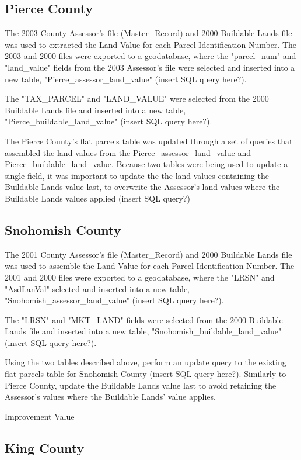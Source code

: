 \subsection{Pierce County}

The 2003 County Assessor's file (Master_Record) and 2000 Buildable
Lands file was used to extracted the Land Value for each Parcel
Identification Number. The 2003 and 2000 files were exported to a
geodatabase, where the "parcel_num" and "land_value" fields from
the 2003 Assessor's file were selected and inserted into a new
table, "Pierce_assessor_land_value" (insert SQL query here?).

The "TAX_PARCEL" and "LAND_VALUE" were selected from the 2000
Buildable Lands file and inserted into a new table,
"Pierce_buildable_land_value" (insert SQL query here?).

The Pierce County's flat parcels table was updated through a set
of queries that assembled the land values from the
Pierce_assessor_land_value and Pierce_buildable_land_value.
Because two tables were being used to update a single field, it
was important to update the the land values containing the
Buildable Lands value last, to overwrite the Assessor's land
values where the Buildable Lands values applied (insert SQL
query?)

\subsection{Snohomish County}

The 2001 County Assessor's file (Master_Record) and 2000 Buildable
Lands file was used to assemble the Land Value for each Parcel
Identification Number. The 2001 and 2000 files were exported to a
geodatabase, where the "LRSN" and "AsdLanVal" selected and
inserted into a new table, "Snohomish_assessor_land_value" (insert
SQL query here?).

The "LRSN" and "MKT_LAND" fields were selected from the 2000
Buildable Lands file and inserted into a new table,
"Snohomish_buildable_land_value" (insert SQL query here?).

Using the two tables described above, perform an update query to
the existing flat parcels table for Snohomish County (insert SQL
query here?). Similarly to Pierce County, update the Buildable
Lands value last to avoid retaining the Assessor's values where
the Buildable Lands' value applies.


Improvement Value

\subsection{King County}

